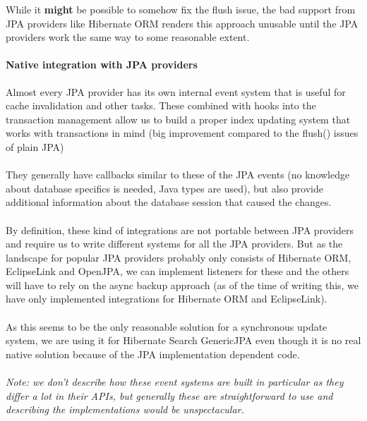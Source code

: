 \noindent
While it \textbf{might} be possible to somehow fix the flush issue, the bad support from JPA providers like Hibernate ORM renders this approach unusable until the JPA providers work the same way to some reasonable extent.

\pagebreak

\paragraph{Native integration with JPA providers}

Almost every JPA provider has its own internal event system that is useful for cache invalidation and other tasks. These combined with hooks into the transaction management allow us to build a proper index updating system that works with transactions in mind (big improvement compared to the flush() issues of plain JPA)
\\\\
They generally have callbacks similar to these of the JPA events (no knowledge about database specifics is needed, Java types are used), but also provide additional information about the database session that caused the changes.
\\\\
By definition, these kind of integrations are not portable between JPA providers and require us to write different systems for all the JPA providers. But as the landscape for popular JPA providers probably only consists of Hibernate ORM, EclipseLink and OpenJPA, we can implement listeners for these and the others will have to rely on the async backup approach (as of the time of writing this, we have only implemented integrations for Hibernate ORM and EclipseLink).
\\\\
As this seems to be the only reasonable solution for a synchronous update system, we are using it for Hibernate Search GenericJPA even though it is no real native solution because of the JPA implementation dependent code.
\\\\
\textit{Note: we don't describe how these event systems are built in particular as they differ a lot in their APIs, but generally these are straightforward to use and describing the implementations would be unspectacular.}

\pagebreak

